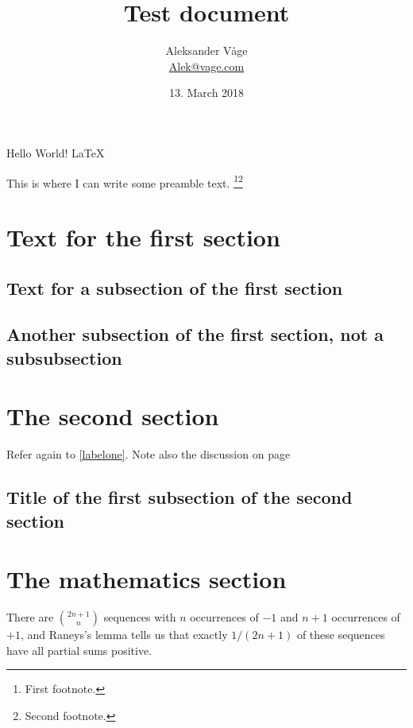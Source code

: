 \documentclass{article}
\title{Test document}
\author{Aleksander V\aa ge \\ \url{Alek@vage.com}}
\date{13. March 2018}
\begin{document}
\pagestyle{fancy}
\lhead{\today}
\chead{}
\lfoot{}
\cfoot{}
\rfoot{\thepage}

\renewcommand{\familydefault}{\sfdefault}
\selectfont

\maketitle
\tableofcontents
\newpage

Hello World! \LaTeX

This is where I can write some preamble text. \footnote{First footnote.}\footnote{Second footnote.}

\section{Text for the first section}
\lipsum[1]

\subsection{Text for a subsection of the first section}
\lipsum[2-3]
\label{labelone}

\subsection{Another subsection of the first section, not a subsubsection}
\lipsum[4-5]
\label{labeltwo}

\section{The second section}
\lipsum[6]

Refer again to \ref{labelone}.
Note also the discussion on page \pageref{labeltwo}

\subsection{Title of the first subsection of the second section}
\lipsum[7]


\section{The mathematics section}
There are $\binom{2n+1}{n}$ sequences with $n$ occurrences of $-1$ and $n+1$ occurrences of $+1$, and Raneys's lemma tells us that exactly $1/(2n+1)$ of these sequences have all partial sums positive.
\end{document}
